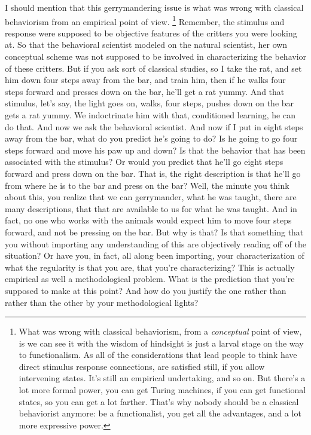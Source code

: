 \documentclass[12pt,a4paper]{report}
\begin{document}
I should mention that this gerrymandering issue is what was wrong with classical behaviorism from an empirical point of
view. \footnote{What was wrong with
classical behaviorism, from a \emph{conceptual} point of view, is we can see it with
the wisdom of hindsight is just a larval stage on the way to functionalism. As
all of the considerations that lead people to think have direct stimulus
response connections, are satisfied still, if you allow intervening states. It's still an empirical undertaking, and so on. But there's a
lot more formal power, you can get Turing machines, if you can get functional
states, so you can get a lot farther. That's why
nobody should be a classical behaviorist anymore: be a functionalist, you get
all the advantages, and a lot more expressive power.} Remember, the stimulus and response were supposed to be
objective features of the critters you were looking at. So that the behavioral
scientist modeled on the natural scientist, her own conceptual scheme was not
supposed to be involved in characterizing the behavior of these critters. But
if you ask sort of classical studies, so I take the rat, and set him down four
steps away from the bar, and train him, then if he walks four steps forward and
presses down on the bar, he'll get a rat yummy. And that stimulus, let's say,
the light goes on, walks, four steps, pushes down on the bar gets a rat yummy.
We indoctrinate him with that, conditioned learning, he can do that. And now
we ask the behavioral scientist. And now if I put in eight steps away from
the bar, what do you predict he's going to do? Is he going to go four steps
forward and move his paw up and down? Is that the behavior that has been
associated with the stimulus? Or would you predict that he'll go eight steps
forward and press down on the bar. That is, the right description is that he'll
go from where he is to the bar and press on the bar? Well, the minute you think
about this, you realize that we can gerrymander, what he was taught,
there are many descriptions, that that are available to us for what he was
taught. And in fact, no one who works with the animals would expect him to
move four steps forward, and not be pressing on the bar. But why
is that? Is that something that you without importing any understanding of
this are objectively reading off of the situation? Or have you, in fact, all
along been importing, your characterization of what the regularity
is that you are, that you're characterizing? This is actually empirical as well a methodological
problem. What is the prediction that you're supposed to make at this point?
And how do you justify the one rather than rather than the other by your
methodological lights?
\end{document}
